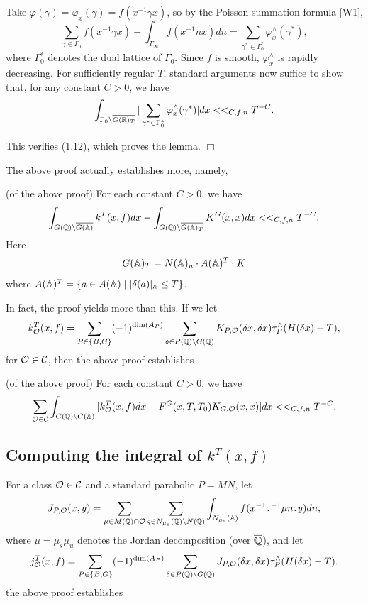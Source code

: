 Take $\varphi (\gamma )=\varphi _x(\gamma )=f(x^{-1}\gamma x)$, so by the
Poisson summation formula [W1], 
\[
\sum_{\gamma \in \Gamma _0}f(x^{-1}\gamma x)-\int_{\Gamma _\infty
}f(x^{-1}nx)dn=\sum_{\gamma ^{*}\in \Gamma _0^{*}}\varphi _x^{\wedge
}(\gamma ^{*}), 
\]
where $\Gamma _0^{*}$ denotes the dual lattice of $\Gamma _0$. Since $f$ is
smooth, $\varphi _x^{\wedge }$ is rapidly decreasing. For sufficiently
regular $T$, standard arguments now suffice to show that, for any constant $%
C>0$, we have 
\[
\int_{\Gamma _0\backslash \overline{G({\Bbb{R}})_T}}|\sum_{\gamma ^{*}\in
\Gamma _0^{*}}\varphi _x^{\wedge }(\gamma ^{*})|dx<<_{C,f,n}T^{-C}. 
\]

This verifies (1.12), which proves the lemma. $\Box $

The above proof actually establishes more, namely,

\begin{corollary}
(of the above proof) For each constant $C>0$, we have 
\[
\int_{G({\Bbb{Q}})\backslash \overline{G({\Bbb{A}})}}k^T(x,f)dx-\int_{G({\Bbb{Q}}%
)\backslash \overline{G({\Bbb{A}})_T}}K^G(x,x)dx<<_{C,f,n}T^{-C}. 
\]
Here 
\[
G({\Bbb{A}})_T=N({\Bbb{A}})_u\cdot A({\Bbb{A}})^T\cdot K 
\]
where $A({\Bbb{A}})^T=\{a\in A({\Bbb{A}})\;|\;|\delta (a)|_{\Bbb A}\leq T\}$.
\end{corollary}

In fact, the proof yields more than this. If we let 
\[
k_{{\cal{O}}}^T(x,f)=\sum_{P\in \{B,G\}}(-1)^{\dim (A_P)}\sum_{\delta \in
P({\Bbb{Q}})\backslash G({\Bbb{Q}})}K_{P,{\cal{O}}}(\delta x,\delta x)\tau
_P^{\wedge }(H(\delta x)-T), 
\]
for ${\cal{O}}\in {\cal{C}}$, then the above proof establishes

\begin{corollary}
(of the above proof) For each constant $C>0$, we have 
\[
\sum_{{\cal{O}}\in {\cal{C}}}\int_{G({\Bbb{Q}})\backslash \overline{G(\Bbb{%
A})}}|k_{{\cal{O}}}^T(x,f)dx-F^G(x,T,T_0)K_{G,{\cal{O}}%
}(x,x)|dx<<_{C,f,n}T^{-C}. 
\]
\end{corollary}

\subsection{Computing the integral of $k^T(x,f)$}

For a class ${\cal{O}}\in {\cal{C}}$ and a standard parabolic $P=MN$,
let 
\[
J_{P,{\cal{O}}}(x,y)=\sum_{\mu \in M({\Bbb{Q}})\cap {\cal{O}}%
}\sum_{\varsigma \in N_{\mu _s}({\Bbb{Q}})\backslash N({\Bbb{Q}})}\int_{N_{\mu
_s}({\Bbb{A}})}f(x^{-1}\varsigma ^{-1}\mu n\varsigma y)dn, 
\]
where $\mu =\mu _s\mu _u$ denotes the Jordan decomposition (over $\overline{%
{\Bbb{Q}}}$), and let 
\[
j_{{\cal{O}}}^T(x,f)=\sum_{P\in \{B,G\}}(-1)^{\dim (A_P)}\sum_{\delta \in
P({\Bbb{Q}})\backslash G({\Bbb{Q}})}J_{P,{\cal{O}}}(\delta x,\delta x)\tau
_P^{\wedge }(H(\delta x)-T). 
\]
the above proof establishes

